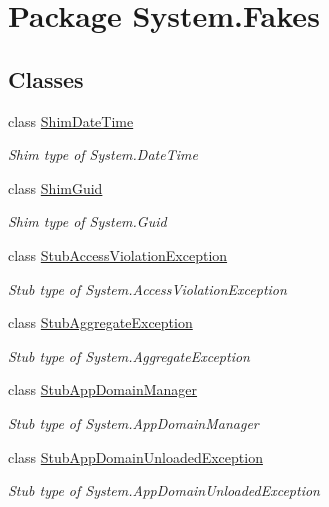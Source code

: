 \hypertarget{namespace_system_1_1_fakes}{\section{Package System.\-Fakes}
\label{namespace_system_1_1_fakes}
}
\subsection*{Classes}
\begin{DoxyCompactItemize}
\item 
class \hyperlink{class_system_1_1_fakes_1_1_shim_date_time}{Shim\-Date\-Time}
\begin{DoxyCompactList}\small\item\em Shim type of System.\-Date\-Time\end{DoxyCompactList}\item 
class \hyperlink{class_system_1_1_fakes_1_1_shim_guid}{Shim\-Guid}
\begin{DoxyCompactList}\small\item\em Shim type of System.\-Guid\end{DoxyCompactList}\item 
class \hyperlink{class_system_1_1_fakes_1_1_stub_access_violation_exception}{Stub\-Access\-Violation\-Exception}
\begin{DoxyCompactList}\small\item\em Stub type of System.\-Access\-Violation\-Exception\end{DoxyCompactList}\item 
class \hyperlink{class_system_1_1_fakes_1_1_stub_aggregate_exception}{Stub\-Aggregate\-Exception}
\begin{DoxyCompactList}\small\item\em Stub type of System.\-Aggregate\-Exception\end{DoxyCompactList}\item 
class \hyperlink{class_system_1_1_fakes_1_1_stub_app_domain_manager}{Stub\-App\-Domain\-Manager}
\begin{DoxyCompactList}\small\item\em Stub type of System.\-App\-Domain\-Manager\end{DoxyCompactList}\item 
class \hyperlink{class_system_1_1_fakes_1_1_stub_app_domain_unloaded_exception}{Stub\-App\-Domain\-Unloaded\-Exception}
\begin{DoxyCompactList}\small\item\em Stub type of System.\-App\-Domain\-Unloaded\-Exception\end{DoxyCompactList}\item 

\end{DoxyCompactItemize}
